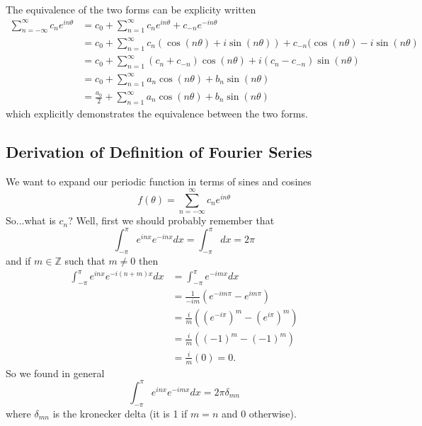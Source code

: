The equivalence of the two forms can be explicity written
\begin{subequations}
\begin{align}
\sum^{\infty}_{n=-\infty}c_{n}e^{in\theta} &= c_{0} +
\sum^{\infty}_{n=1}c_{n}e^{in\theta} + c_{-n}e^{-in\theta}
\\
&= c_0 +
\sum^{\infty}_{n=1}c_{n}(\cos(n\theta)+i\sin(n\theta))+c_{-n}(\cos(n\theta)-i\sin(n\theta)
\\
&= c_{0} + \sum^{\infty}_{n=1} (c_{n}+c_{-n})\cos(n\theta) +
i(c_{n}-c_{-n})\sin(n\theta) \\
&= c_{0} + \sum^{\infty}_{n=1}a_{n}\cos(n\theta) +
b_{n}\sin(n\theta) \\
&= \frac{a_{0}}{2} + \sum^{\infty}_{n=1}a_{n}\cos(n\theta) + b_{n}\sin(n\theta)
\end{align}
\end{subequations}
which explicitly demonstrates the equivalence between the
two forms.

\subsection{Derivation of Definition of Fourier Series}

We want to expand our periodic function in terms of sines
and cosines
\begin{equation}
f(\theta) = \sum^{\infty}_{n=-\infty}c_{n}e^{in\theta}
\end{equation}
So...what is $c_{n}$? Well, first we should probably
remember that
\begin{equation}
\int^{\pi}_{-\pi}e^{inx}e^{-inx}dx = \int^{\pi}_{-\pi}dx =
2\pi
\end{equation}
and if $m\in\mathbb{Z}$ such that $m\neq 0$ then
\begin{subequations}
\begin{align}
\int^{\pi}_{-\pi}e^{inx}e^{-i(n+m)x}dx &=
\int^{\pi}_{-\pi}e^{-imx}dx\\
&= \frac{1}{-im}(e^{-im\pi}-e^{im\pi}) \\
&= \frac{i}{m}( (e^{-i\pi})^{m}-(e^{i\pi})^{m}) \\
&= \frac{i}{m}( (-1)^{m} - (-1)^{m}) \\
&= \frac{i}{m}(0) = 0.
\end{align}
\end{subequations}
So we found in general
\begin{equation}
\int^{\pi}_{-\pi}e^{inx}e^{-imx}dx = 2\pi\delta_{mn}
\end{equation}
where $\delta_{mn}$ is the kronecker delta (it is 1 if $m=n$
and 0 otherwise).

